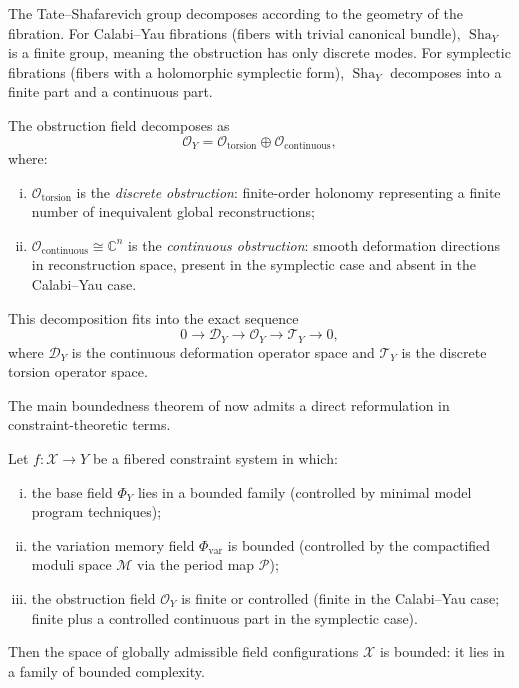 \documentclass[11pt,openany]{book}
\newcommand{\Sha}{\operatorname{Sha}}
\begin{document}
The Tate--Shafarevich group decomposes according to the
geometry of the fibration.  For Calabi--Yau fibrations
(fibers with trivial canonical bundle), $\Sha_Y$ is a
finite group, meaning the obstruction has only discrete
modes.  For symplectic fibrations (fibers with a
holomorphic symplectic form), $\Sha_Y$ decomposes into a
finite part and a continuous part.

\begin{proposition}
\label{prop:obstruction-decomposition}
The obstruction field decomposes as
\[
  \mathcal{O}_Y =
    \mathcal{O}_{\mathrm{torsion}} \oplus
    \mathcal{O}_{\mathrm{continuous}},
\]
where:
\begin{enumerate}[(i)]
  \item $\mathcal{O}_{\mathrm{torsion}}$ is the
    \emph{discrete obstruction}: finite-order holonomy
    representing a finite number of inequivalent global
    reconstructions;
  \item $\mathcal{O}_{\mathrm{continuous}} \cong
    \mathbb{C}^n$ is the \emph{continuous obstruction}:
    smooth deformation directions in reconstruction space,
    present in the symplectic case and absent in the
    Calabi--Yau case.
\end{enumerate}
This decomposition fits into the exact sequence
\[
  0 \to \mathcal{D}_Y \to \mathcal{O}_Y \to
    \mathcal{T}_Y \to 0,
\]
where $\mathcal{D}_Y$ is the continuous deformation
operator space and $\mathcal{T}_Y$ is the discrete torsion
operator space.
\end{proposition}

The main boundedness theorem of \citet{engel2025} now
admits a direct reformulation in constraint-theoretic
terms.

\begin{theorem}
\label{thm:constraint-closure-boundedness}
Let $f : \mathcal{X} \to Y$ be a fibered constraint system
in which:
\begin{enumerate}[(i)]
  \item the base field $\Phi_Y$ lies in a bounded family
    (controlled by minimal model program techniques);
  \item the variation memory field $\Phi_{\mathrm{var}}$
    is bounded (controlled by the compactified moduli
    space $\mathcal{M}$ via the period map
    $\mathcal{P}$);
  \item the obstruction field $\mathcal{O}_Y$ is finite
    or controlled (finite in the Calabi--Yau case; finite
    plus a controlled continuous part in the symplectic
    case).
\end{enumerate}
Then the space of globally admissible field configurations
$\mathcal{X}$ is bounded: it lies in a family of bounded
complexity.
\end{theorem}
\end{document}
